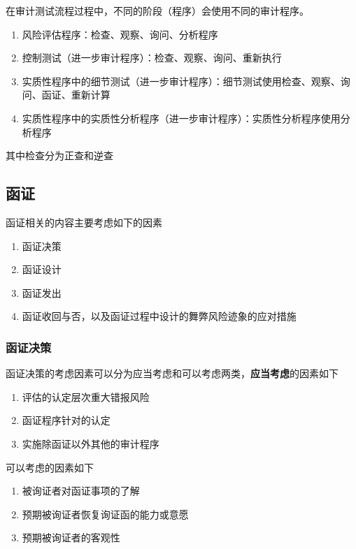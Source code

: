 \documentclass[UTF8,12pt]{ctexart}
\numberwithin{equation}{section} %
\numberwithin{figure}{section}
\numberwithin{table}{section}
\begin{document}
	在审计测试流程过程中，不同的阶段（程序）会使用不同的审计程序。
	\begin{enumerate}
		\item 风险评估程序：检查、观察、询问、分析程序
		
		\item 控制测试（进一步审计程序）：检查、观察、询问、重新执行
		
		\item 实质性程序中的细节测试（进一步审计程序）：细节测试使用检查、观察、询问、函证、重新计算
		
		\item 实质性程序中的实质性分析程序（进一步审计程序）：实质性分析程序使用分析程序
	\end{enumerate}
	
	其中检查分为正查和逆查
	
	\subsection{函证}
	函证相关的内容主要考虑如下的因素
	\begin{enumerate}
		\item 函证决策
		
		\item 函证设计
		
		\item 函证发出
		
		\item 函证收回与否，以及函证过程中设计的舞弊风险迹象的应对措施
	\end{enumerate}
	
	\subsubsection{函证决策}
	函证决策的考虑因素可以分为应当考虑和可以考虑两类，\textbf{应当考虑}的因素如下
	\begin{enumerate}
		\item 评估的认定层次重大错报风险
		
		\item 函证程序针对的认定
		
		\item 实施除函证以外其他的审计程序
	\end{enumerate}
	
	可以考虑的因素如下
	\begin{enumerate}
		\item 被询证者对函证事项的了解
		
		\item 预期被询证者恢复询证函的能力或意愿
		
		\item 预期被询证者的客观性
	\end{enumerate}
	
\end{document}
